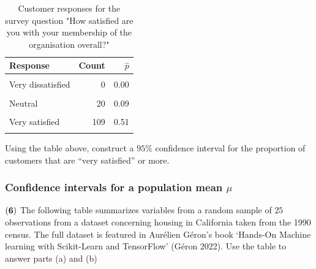 \documentclass[
]{article}
\begin{document}
\begin{table}[H]
\centering\centering
\caption{\label{tab:unnamed-chunk-4}Customer responses for the survey question "How satisfied are you with your membership of the organisation overall?"}
\centering
\begin{tabular}[t]{lrr}
\toprule
Response & Count & $\hat{p}$\\
\midrule
\cellcolor{gray!10}{Completely dissatisfied} & \cellcolor{gray!10}{0} & \cellcolor{gray!10}{0.00}\\
Very dissatisfied & 0 & 0.00\\
\cellcolor{gray!10}{Dissatisfied} & \cellcolor{gray!10}{3} & \cellcolor{gray!10}{0.01}\\
Neutral & 20 & 0.09\\
\cellcolor{gray!10}{Satisfied} & \cellcolor{gray!10}{64} & \cellcolor{gray!10}{0.30}\\
\addlinespace
Very satisfied & 109 & 0.51\\
\cellcolor{gray!10}{Completely satisfied} & \cellcolor{gray!10}{19} & \cellcolor{gray!10}{0.09}\\
\bottomrule
\end{tabular}
\end{table}

Using the table above, construct a \(95\%\) confidence interval for the
proportion of customers that are ``very satisfied'' or more.

\subsubsection{\texorpdfstring{Confidence intervals for a population
mean
\(\mu\)}{Confidence intervals for a population mean \textbackslash mu}}\label{confidence-intervals-for-a-population-mean-mu}

\(\bf (6)\) The following table summarizes variables from a random
sample of \(25\) observations from a dataset concerning housing in
California taken from the 1990 census. The full dataset is featured in
Aurélien Géron's book `Hands-On Machine learning with Scikit-Learn and
TensorFlow' (Géron 2022). Use the table to answer parts (a) and (b)
\end{document}

